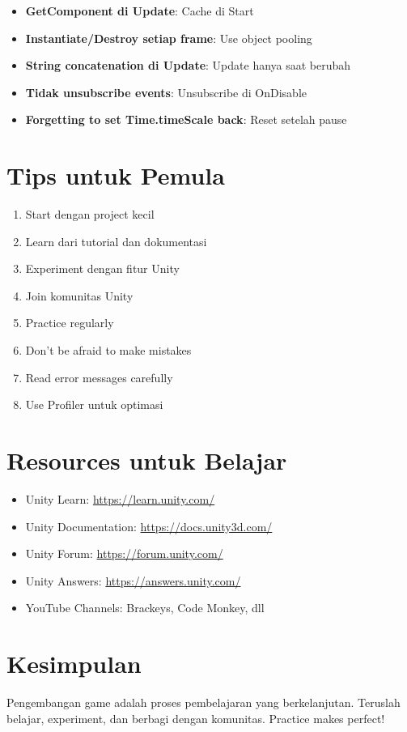 \begin{itemize}
\item \textbf{GetComponent di Update}: Cache di Start
\item \textbf{Instantiate/Destroy setiap frame}: Use object pooling
\item \textbf{String concatenation di Update}: Update hanya saat berubah
\item \textbf{Tidak unsubscribe events}: Unsubscribe di OnDisable
\item \textbf{Forgetting to set Time.timeScale back}: Reset setelah pause
\end{itemize}

\section{Tips untuk Pemula}

\begin{enumerate}
\item Start dengan project kecil
\item Learn dari tutorial dan dokumentasi
\item Experiment dengan fitur Unity
\item Join komunitas Unity
\item Practice regularly
\item Don't be afraid to make mistakes
\item Read error messages carefully
\item Use Profiler untuk optimasi
\end{enumerate}

\section{Resources untuk Belajar}

\begin{itemize}
\item Unity Learn: \url{https://learn.unity.com/}
\item Unity Documentation: \url{https://docs.unity3d.com/}
\item Unity Forum: \url{https://forum.unity.com/}
\item Unity Answers: \url{https://answers.unity.com/}
\item YouTube Channels: Brackeys, Code Monkey, dll
\end{itemize}

\section{Kesimpulan}

Pengembangan game adalah proses pembelajaran yang berkelanjutan. Teruslah belajar, experiment, dan berbagi dengan komunitas. Practice makes perfect!
